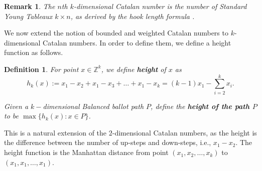 \documentclass[12pt,notitlepage]{amsart}
\numberwithin{equation}{section}
\theoremstyle{thmstyleone}%
\theoremstyle{thmstyletwo}%
\newtheorem{remark}[theorem]{Remark}%
\theoremstyle{thmstylethree}%
\newtheorem{definition}[theorem]{Definition}%
\numberwithin{theorem}{section}
\numberwithin{equation}{section}
\begin{document}
\begin{remark}
    The $n$th $k$-dimensional Catalan number is the number of Standard Young Tableaux $k\times n$, as derived by the hook length formula \cite{MR4621625}.
\end{remark}

We now extend the notion of bounded and weighted Catalan numbers to $k$-dimensional Catalan numbers. In order to define them, we define a height function as follows.

\begin{definition}
    \label{defn:height-manhattan}
    For point $x \in \mathbb{Z}^k$, we define \textbf{height} of $x$  as $$h_k(x) := x_1 - x_2 + x_1 -x_3 +\ldots +x_1 - x_k = (k-1)x_1 - \sum_{i=2}^k x_i.$$

    Given a $k-$dimensional Balanced ballot path $P$, define the \textbf{height of the path $P$} to be $\max \{h_k(x): x \in P \}$.
\end{definition}

This is a natural extension of the $2$-dimensional Catalan numbers, as the height is the difference between the number of up-steps and down-steps, i.e., $x_1 - x_2$. The height function is the Manhattan distance \cite{manhattan_distance} from point $(x_1,x_2,\ldots,x_k)$ to $(x_1,x_1,\ldots, x_1)$.
\end{document}
